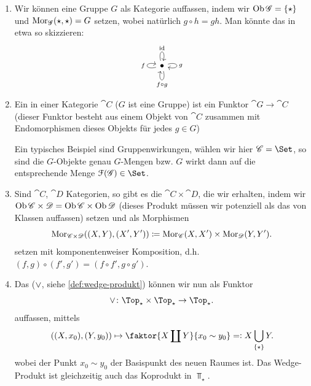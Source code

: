 \begin{example}\label{ex:mehr-kategorien:gruppen-produkte-wedge-smash-einhängung-funktorkategorie}
    \begin{enumerate}[1)]
        \item Wir können eine Gruppe $G$ als Kategorie auffassen, indem wir  $\operatorname{Ob}{\mathscr{G}} = \left \{\star\right\} $ und $\operatorname{Mor}_{\mathscr{G}}(\star,\star) = G$ setzen, wobei natürlich $g \circ  h = gh$. Man könnte das in etwa so skizzieren:
            \[
\begin{tikzcd}
            \bullet \ar[loop left]{}{f} \ar[loop above]{}{\id} \ar[loop right]{}{g} \ar[loop below]{}{f \circ g}
\end{tikzcd}
\]
\item Ein  in einer Kategorie $\cat{C}$ ($G$ ist eine Gruppe) ist ein Funktor  $\cat{G} \to  \cat{C}$ (dieser Funktor besteht aus einem Objekt von $\cat{C}$ zusammen mit Endomorphismen dieses Objekts für jedes $g\in G$)
    \begin{remark*}
        Ein typisches Beispiel sind Gruppenwirkungen, wählen wir hier $\cat{C} = \Set$, so sind die $G$-Objekte genau  $G$-Mengen bzw.  $G$ wirkt dann auf die entsprechende Menge  $\mathcal{F}(\cat{G})\in \Set$.
    \end{remark*}
\item Sind $\cat{C}$, $\cat{D}$ Kategorien, so gibt es die  $\cat{C} \times  \cat{D}$, die wir erhalten, indem wir $\operatorname{Ob}{\mathscr{C} \times \mathscr{D}} = \operatorname{Ob}{\mathscr{C}} \times \operatorname{Ob}{\mathscr{D}} $ (dieses Produkt müssen wir potenziell als das von Klassen auffassen) setzen und als Morphismen
    \[
        \operatorname{Mor}_{\mathscr{C}\times \mathscr{D}}((X,Y),(X',Y')) \coloneqq  \operatorname{Mor}_{\mathscr{C}}(X,X') \times \operatorname{Mor}_{\mathscr{D}}(Y,Y') 
    .\] 
    setzen mit komponentenweiser Komposition, d.h. $(f,g) \circ  (f', g') = (f \circ  f', g \circ  g')$.
\item Das  ($\vee$, siehe \autoref{def:wedge-produkt}) können wir nun als Funktor
     \[
    \twedge \colon \Top_{\star} \times \Top_{\star} \to  \Top_{\star}
    .\] 
    auffassen, mittels
    \[
        ((X,x_0),(Y,y_0)) \mapsto \faktor{X \coprod Y}{x_0 \sim  y_0} =\vcentcolon X \bigcup_{\left \{\star\right\} } Y 
    .\] 
    wobei der Punkt $x_0 \sim y_0$ der Basispunkt des neuen Raumes ist. Das Wedge-Produkt ist gleichzeitig auch das Koprodukt in $\Top_{\star}$.



\end{enumerate}
\end{example}
